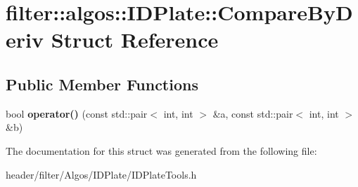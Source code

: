 \hypertarget{structfilter_1_1algos_1_1_i_d_plate_1_1_compare_by_deriv}{}\section{filter\+:\+:algos\+:\+:I\+D\+Plate\+:\+:Compare\+By\+Deriv Struct Reference}
\label{structfilter_1_1algos_1_1_i_d_plate_1_1_compare_by_deriv}
\subsection*{Public Member Functions}
\begin{DoxyCompactItemize}
\item 
\mbox{\label{structfilter_1_1algos_1_1_i_d_plate_1_1_compare_by_deriv_a544199080557ccaa37aca7ac2b72b5a5}} 
bool {\bfseries operator()} (const std\+::pair$<$ int, int $>$ \&a, const std\+::pair$<$ int, int $>$ \&b)
\end{DoxyCompactItemize}


The documentation for this struct was generated from the following file\+:\begin{DoxyCompactItemize}
\item 
header/filter/\+Algos/\+I\+D\+Plate/I\+D\+Plate\+Tools.\+h\end{DoxyCompactItemize}
